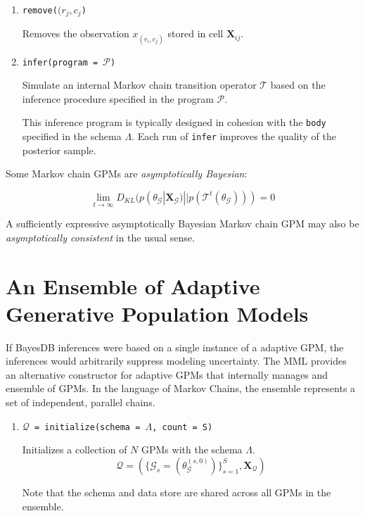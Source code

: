 \documentclass[10pt,letterpaper]{article}
\newcommand{\set}[1]{\{#1\}}
\newcommand{\G}{\mathcal{G}}
\begin{document}
\begin{enumerate}
\item \texttt{remove($(r_j,c_j$)}

    Removes the observation $x_{(r_i,c_j)}$ stored in cell $\mathbf{X}_{ij}$.

\item \texttt{infer(program = $\mathcal{P}$)}

    Simulate an internal Markov chain transition operator $\mathcal{T}$ based on
    the inference procedure specified in the program $\mathcal{P}$.

    This inference program is typically designed in cohesion with the
    \texttt{body} specified in the schema $\Lambda$. Each run of \texttt{infer}
    improves the quality of the posterior sample.
\end{enumerate}

Some Markov chain GPMs are \textit{asymptotically Bayesian}:

\begin{equation*}
\lim_{t\to\infty}D_{KL}(p(\theta_\G|\mathbf{X_\G}) ||
p(\mathcal{T}^t(\theta_\G))) = 0
\end{equation*}

A sufficiently expressive asymptotically Bayesian Markov chain GPM may also be
\textit{asymptotically consistent} in the usual sense.

\section{An Ensemble of Adaptive Generative Population Models}
\label{sec:ensemble}

If BayesDB inferences were based on a single instance of a adaptive GPM, the
inferences would arbitrarily suppress modeling uncertainty. The MML provides an
alternative constructor for adaptive GPMs that internally manages and ensemble
of GPMs. In the language of Markov Chains, the ensemble represents a set of
independent, parallel chains.

\begin{enumerate}
\item \texttt{$\mathcal{Q}$ = initialize(schema = $\Lambda$, count = S)}

    Initializes a collection of $N$ GPMs with the schema $\Lambda$.
    $$
    \mathcal{Q} =
    (\set{\G_s = (\theta_{\G}^{(s,0)})}_{s=1}^S,
    \mathbf{X_\mathcal{Q}})
    $$

    Note that the schema and data store are shared across all GPMs in the
    ensemble.
\end{enumerate}
\end{document}
